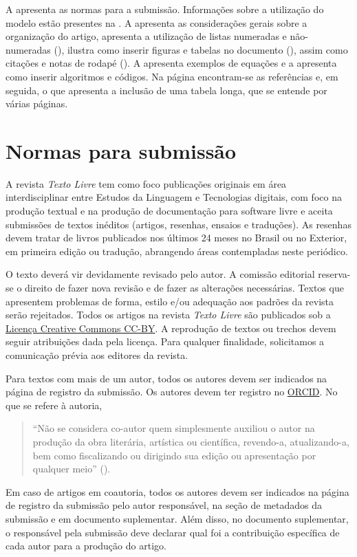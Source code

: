 \documentclass{textolivre}
\begin{document}
A  apresenta as normas para a submissão. Informações sobre a utilização do modelo
estão presentes na . A  apresenta as considerações gerais sobre a organização do artigo, 
apresenta a utilização de listas numeradas e não-numeradas (), 
ilustra como inserir figuras e tabelas no documento (), assim como citações 
e notas de rodapé (). A  apresenta exemplos de equações 
e a  apresenta como inserir algoritmos e códigos. 
Na página \pageref{sec-bib} encontram-se as referências e, em seguida, o  que
apresenta a inclusão de uma tabela longa, que se entende por várias páginas. 

\lipsum[1-5]

\section{Normas para submissão}\label{sec-normas}
A revista \emph{Texto Livre} tem como foco publicações originais em área interdisciplinar entre 
Estudos da Linguagem e Tecnologias digitais, com foco na produção textual e na produção de 
documentação para software livre e aceita submissões de textos inéditos (artigos, resenhas, ensaios e traduções). 
As resenhas devem tratar de livros publicados nos últimos 24 meses no Brasil ou no Exterior, 
em primeira edição ou tradução, abrangendo áreas contempladas neste periódico.

O texto deverá vir devidamente revisado pelo autor. A comissão editorial reserva-se o direito de 
fazer nova revisão e de fazer as alterações necessárias. Textos que apresentem problemas de forma, 
estilo e/ou adequação aos padrões da revista serão rejeitados.
Todos os artigos na revista \emph{Texto Livre} são publicados sob 
a \href{https://creativecommons.org/}{Licença Creative Commons CC-BY}. 
A reprodução de textos ou trechos devem seguir atribuições dada pela licença. 
Para qualquer finalidade, solicitamos a comunicação prévia aos editores da revista.

Para textos com mais de um autor, todos os autores devem ser indicados na página de registro da submissão.
Os autores devem ter registro no \href{https://orcid.org/}{ORCID}. No que se refere à autoria,
\begin{quote} 
``Não se considera co-autor quem simplesmente auxiliou o autor na produção da obra literária, artística ou científica, 
revendo-a, atualizando-a, bem como fiscalizando ou dirigindo sua edição ou apresentação por qualquer meio'' ().
\end{quote}
Em caso de artigos em coautoria, todos os autores devem ser indicados na página de registro da submissão pelo autor 
responsável, na seção de metadados da submissão e em documento suplementar. Além disso, no documento suplementar, 
o responsável pela submissão deve declarar qual foi a contribuição específica de cada autor para a produção do artigo.
\end{document}
